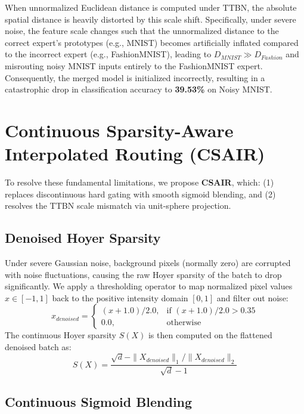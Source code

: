 \documentclass{article}
\theoremstyle{plain}
\theoremstyle{definition}
\theoremstyle{remark}
\begin{document}
When unnormalized Euclidean distance is computed under TTBN, the absolute spatial distance is heavily distorted by this scale shift. Specifically, under severe noise, the feature scale changes such that the unnormalized distance to the correct expert's prototypes (e.g., MNIST) becomes artificially inflated compared to the incorrect expert (e.g., FashionMNIST), leading to $D_{MNIST} \gg D_{Fashion}$ and misrouting noisy MNIST inputs entirely to the FashionMNIST expert. Consequently, the merged model is initialized incorrectly, resulting in a catastrophic drop in classification accuracy to \textbf{39.53\%} on Noisy MNIST.

\section{Continuous Sparsity-Aware Interpolated Routing (CSAIR)}
\label{sec:proposed}

To resolve these fundamental limitations, we propose \textbf{CSAIR}, which: (1) replaces discontinuous hard gating with smooth sigmoid blending, and (2) resolves the TTBN scale mismatch via unit-sphere projection.

\subsection{Denoised Hoyer Sparsity}

Under severe Gaussian noise, background pixels (normally zero) are corrupted with noise fluctuations, causing the raw Hoyer sparsity of the batch to drop significantly. We apply a thresholding operator to map normalized pixel values $x \in [-1, 1]$ back to the positive intensity domain $[0, 1]$ and filter out noise:
\begin{equation}
    x_{denoised} = \begin{cases}
        (x + 1.0)/2.0, & \text{if } (x + 1.0)/2.0 > 0.35 \\
        0.0, & \text{otherwise}
    \end{cases}
\end{equation}
The continuous Hoyer sparsity $S(X)$ is then computed on the flattened denoised batch as:
\begin{equation}
    S(X) = \frac{\sqrt{d} - \|X_{denoised}\|_1 / \|X_{denoised}\|_2}{\sqrt{d} - 1}
\end{equation}

\subsection{Continuous Sigmoid Blending}
\end{document}
